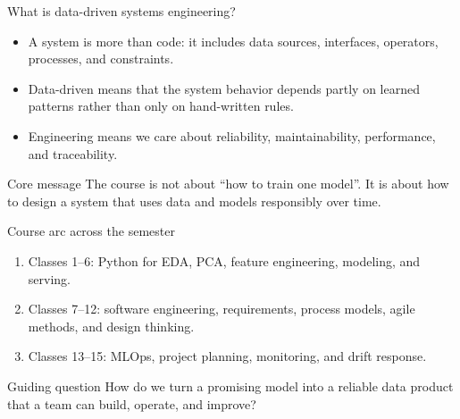 \begin{frame}{What is data-driven systems engineering?}
\begin{itemize}
\item A system is more than code: it includes data sources, interfaces, operators, processes, and constraints.
\item Data-driven means that the system behavior depends partly on learned patterns rather than only on hand-written rules.
\item Engineering means we care about reliability, maintainability, performance, and traceability.
\end{itemize}
\begin{alertblock}{Core message}
The course is not about ``how to train one model''. It is about how to design a system that uses data and models responsibly over time.
\end{alertblock}
\coursefooter
\end{frame}

\begin{frame}{Course arc across the semester}
\begin{enumerate}
\item Classes 1--6: Python for EDA, PCA, feature engineering, modeling, and serving.
\item Classes 7--12: software engineering, requirements, process models, agile methods, and design thinking.
\item Classes 13--15: MLOps, project planning, monitoring, and drift response.
\end{enumerate}
\vspace{0.7em}
\begin{block}{Guiding question}
How do we turn a promising model into a reliable data product that a team can build, operate, and improve?
\end{block}
\coursefooter
\end{frame}

